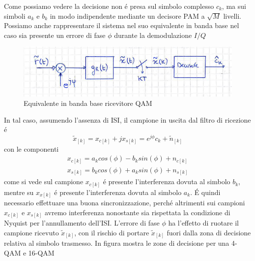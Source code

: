         Come possiamo vedere la decisione non é presa sul simbolo complesso $c_k$, ma sui simboli $a_k$ e $b_k$ in modo 
        indipendente mediante un decisore PAM a $\sqrt{M}$ livelli. Possiamo anche rappresentare il sistema nel suo
        equivalente in banda base nel caso sia presente un errore di fase $\phi$ durante la demodulazione $I/Q$
        \begin{figure}[H]
            \centering
            \includegraphics[width = 12cm]{media/equivalente in banda base ricevitore qam.png}
            \caption{Equivalente in banda base ricevitore QAM}
        \end{figure}
        In tal caso, assumendo l'assenza di ISI, il campione in uscita dal filtro di ricezione é 
        \[
            \tilde{x}_{[k]} = x_{c[k]}+ jx_{s[k]} = e^{j\phi}c_k+\tilde{n}_{[k]}  
        \]
        con le componenti 
        \begin{gather}
            x_{c[k]} = a_k cos(\phi) - b_k sin(\phi) + n_{c[k]}\nonumber \\
            x_{s[k]} = b_k cos(\phi) + a_k sin(\phi) + n_{s[k]}\nonumber
        \end{gather}
	    come si vede sul campione $x_{c[k]}$ é presente l'interferenza dovuta al simbolo $b_k$, mentre su $x_{x[k]}$ 
        é presente l'interferenza dovuta al simbolo $a_k$. É quindi necessario effettuare una buona sincronizzazione,  
        perché altrimenti sui campioni $x_{c[k]}$ e $x_{s[k]}$ avremo interferenza nonostante sia rispettata la condizione 
        di Nyquist per l'annullamento dell'ISI. L'errore di fase $\phi$ ha l'effetto di ruotare il campione ricevuto 
        $\tilde{x}_{[k]}$, con il rischio di portare $\tilde{x}_{[k]}$ fuori dalla zona di decisione relativa al simbolo 
        trasmesso. In figura mostra le zone di decisione per una 4-QAM e 16-QAM
